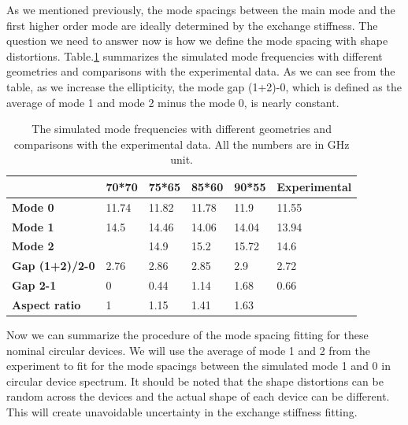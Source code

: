 As we mentioned previously, the mode spacings between the main mode and the first higher order mode are ideally determined by the exchange stiffness. The question we need to answer now is how we define the mode spacing with shape distortions. Table.\ref{shapedist} summarizes the simulated mode frequencies with different geometries and comparisons with the experimental data. As we can see from the table, as we increase the ellipticity, the mode gap (1+2)-0, which is defined as the average of mode 1 and mode 2 minus the mode 0, is nearly constant.


\begin{table}[ht!]
\centering
\begin{tabular}{|l|l|l|l|l|l|}
\hline
\textbf{} & \textbf{70*70} & \textbf{75*65} & \textbf{85*60} & \textbf{90*55} & \textbf{Experimental} \\ \hline
\textbf{Mode 0} & 11.74 & 11.82 & 11.78 & 11.9 & 11.55 \\ \hline
\textbf{Mode 1} & 14.5 & 14.46 & 14.06 & 14.04 & 13.94 \\ \hline
\textbf{Mode 2} &  & 14.9 & 15.2 & 15.72 & 14.6 \\ \hline
\textbf{Gap (1+2)/2-0} & 2.76 & 2.86 & 2.85 & 2.9 & 2.72 \\ \hline
\textbf{Gap 2-1} & 0 & 0.44 & 1.14 & 1.68 & 0.66 \\ \hline
\textbf{Aspect ratio} & 1 & 1.15 & 1.41 & 1.63 &  \\ \hline
\end{tabular}
\caption{The simulated mode frequencies with different geometries and comparisons with the experimental data. All the numbers are in GHz unit.}
\label{shapedist}
\end{table}

Now we can summarize the procedure of the mode spacing fitting for these nominal circular devices. We will use the average of mode 1 and 2 from the experiment to fit for the mode spacings between the simulated mode 1 and 0 in circular device spectrum. It should be noted that the shape distortions can be random across the devices and the actual shape of each device can be different. This will create unavoidable uncertainty in the exchange stiffness fitting.


